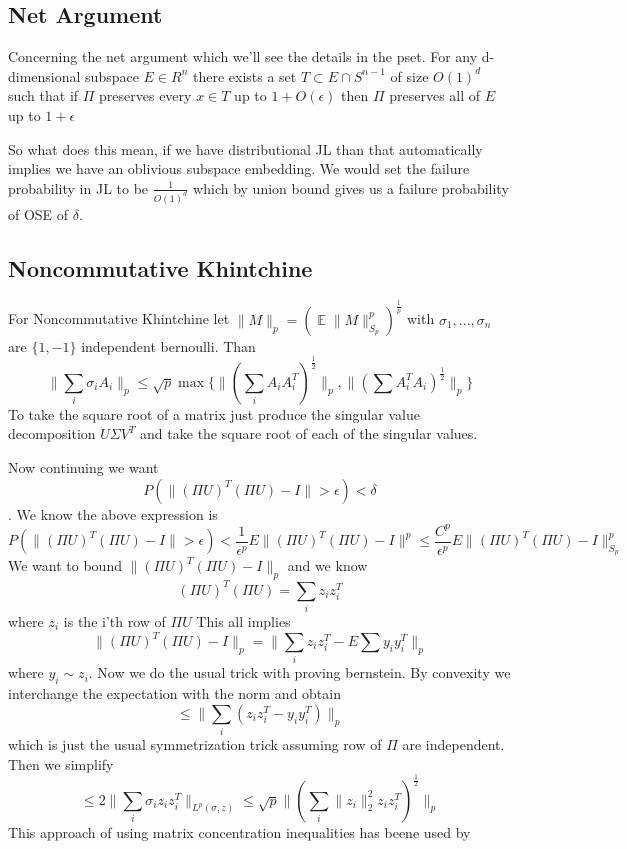 \documentclass[11pt]{article}
\DeclareMathOperator*{\E}{\mathbb{E}}
\begin{document}
\subsection{Net Argument}

Concerning the net argument which we'll see the details in the pset.  For any d-dimensional subspace $E \in R^n$ there exists a set $T \subset E \cap S^{n-1}$ of size $O(1)^d$ such that if $\Pi$ preserves every $x \in T$ up to $1 + O(\epsilon)$ then $\Pi$ preserves all of $E$ up to $1 + \epsilon$ 

So what does this mean, if we have distributional JL than that automatically implies we have an oblivious subspace embedding.  We would set the failure probability in JL to be $\frac{1}{O(1)^d}$ which by union bound gives us a failure probability of OSE of $\delta$.


\subsection{Noncommutative Khintchine}
For Noncommutative Khintchine let $\|M\|_p = (\E\|M \|_{S_p}^p)^{\frac{1}{p}}$ with $\sigma_1, ..., \sigma_n$ are $\{1,-1\}$ independent bernoulli.  Than $$\|\sum\limits_{i}\sigma_iA_i\|_p \leq \sqrt{p}\max \big\{\|(\sum\limits_{i} A_i A_i^T)^{\frac{1}{2}} \|_p, \|(\sum A_i^T A_i)^{\frac{1}{2}} \|_p \big\}$$ 
To take the square root of a matrix just produce the singular value decomposition $U\Sigma V^T$ and take the square root of each of the singular values.  

Now continuing we want $$P(\|(\Pi U)^T (\Pi U)  - I\| > \epsilon) < \delta$$.  We know the above expression is 
$$P(\|(\Pi U)^T (\Pi U)  - I\| > \epsilon) < \frac{1}{\epsilon^p}E\|(\Pi U)^T (\Pi U)  - I \|^p \leq \frac{C^p}{\epsilon^p}E\|(\Pi U)^T (\Pi U)  - I\|_{S_p}^p$$
We want to bound $\|(\Pi U)^T (\Pi U)  - I\|_p$ and we know
$$(\Pi U)^T(\Pi U) = \sum\limits_{i} z_i z_i^T$$ where $z_i$ is the i'th row of $\Pi U$
This all implies $$\|(\Pi U)^T(\Pi U) - I\|_p = \| \sum\limits_{i} z_i z_i^T - E\sum y_i y_i^T\|_p$$
where $y_i \sim z_i$.  Now we do the usual trick with proving bernstein.  By convexity we interchange the expectation with the norm and obtain 
$$\leq \| \sum\limits_{i} (z_i z_i^T - y_i y_i^T)\|_p$$
which is just the usual symmetrization trick assuming row of $\Pi$ are independent.  Then we simplify
$$\leq 2\|\sum\limits_{i}\sigma_i z_i z_i^T\|_{L^p(\sigma, z)} \leq \sqrt{p}\|(\sum\limits_{i} \|z_i\|_2^2 z_iz_i^T)^{\frac{1}{2}}\|_p$$  
This approach of using matrix concentration inequalities has beene used by 
\end{document}
